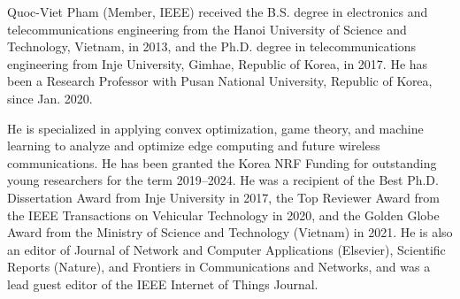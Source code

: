 \documentclass[journal]{IEEEtran}
\begin{document}
\begin{IEEEbiography}
{Quoc-Viet Pham} (Member, IEEE) received the B.S. degree in electronics and telecommunications engineering from the Hanoi University of Science and Technology, Vietnam, in 2013, and the Ph.D. degree in telecommunications engineering from Inje University, Gimhae, Republic of Korea, in 2017. He has been a Research Professor with Pusan National University, Republic of Korea, since Jan. 2020.

He is specialized in applying convex optimization, game theory, and machine learning to analyze and optimize edge computing and future wireless communications. He has been granted the Korea NRF Funding for outstanding young researchers for the term 2019–2024. He was a recipient of the Best Ph.D. Dissertation Award from Inje University in 2017, the Top Reviewer Award from the IEEE Transactions on Vehicular Technology in 2020, and the Golden Globe Award from the Ministry of Science and Technology (Vietnam) in 2021. He is also an editor of Journal of Network and Computer Applications (Elsevier), Scientific Reports (Nature), and Frontiers in Communications and Networks, and was a lead guest editor of the IEEE Internet of Things Journal.
\end{IEEEbiography}
\end{document}
